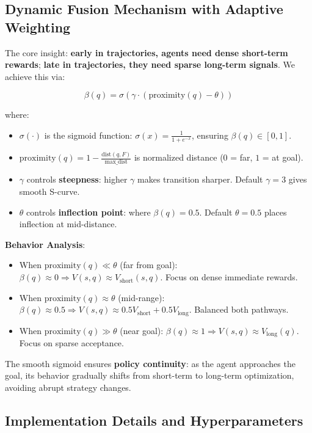 \documentclass[conference]{IEEEtran}
\begin{document}
\subsection{Dynamic Fusion Mechanism with Adaptive Weighting}

The core insight: \textbf{early in trajectories, agents need dense short-term rewards}; \textbf{late in trajectories, they need sparse long-term signals}. We achieve this via:

\begin{equation}
\beta(q) = \sigma(\gamma \cdot (\text{proximity}(q) - \theta))
\label{eq:beta}
\end{equation}

where:
\begin{itemize}
    \item $\sigma(\cdot)$ is the sigmoid function: $\sigma(x) = \frac{1}{1 + e^{-x}}$, ensuring $\beta(q) \in [0, 1]$.
    \item $\text{proximity}(q) = 1 - \frac{\text{dist}(q, F)}{\text{max\_dist}}$ is normalized distance ($0$ = far, $1$ = at goal).
    \item $\gamma$ controls \textbf{steepness}: higher $\gamma$ makes transition sharper. Default $\gamma = 3$ gives smooth S-curve.
    \item $\theta$ controls \textbf{inflection point}: where $\beta(q) = 0.5$. Default $\theta = 0.5$ places inflection at mid-distance.
\end{itemize}

\textbf{Behavior Analysis}:
\begin{itemize}
    \item When $\text{proximity}(q) \ll \theta$ (far from goal): $\beta(q) \approx 0 \Rightarrow V(s,q) \approx V_{\text{short}}(s,q)$. Focus on dense immediate rewards.
    \item When $\text{proximity}(q) \approx \theta$ (mid-range): $\beta(q) \approx 0.5 \Rightarrow V(s,q) \approx 0.5 V_{\text{short}} + 0.5 V_{\text{long}}$. Balanced both pathways.
    \item When $\text{proximity}(q) \gg \theta$ (near goal): $\beta(q) \approx 1 \Rightarrow V(s,q) \approx V_{\text{long}}(q)$. Focus on sparse acceptance.
\end{itemize}

The smooth sigmoid ensures \textbf{policy continuity}: as the agent approaches the goal, its behavior gradually shifts from short-term to long-term optimization, avoiding abrupt strategy changes.

\subsection{Implementation Details and Hyperparameters}
\end{document}
